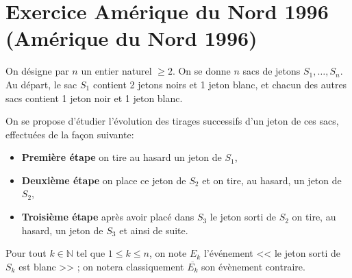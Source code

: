 \documentclass{article}
\makeatletter
\newcommand{\NN}{\mathbb N}
\newcounter{Exercice}
\newcommand{\exercice}[1][\@nil]{\refstepcounter{Exercice}
	\section*{Exercice \theExercice
	\def\tmp{#1}
	\ifx\tmp\@nnil
	\else
	(#1)
	\fi
}}
\makeatother
\begin{document}
\exercice[Amérique du Nord 1996]

On désigne par $n$ un entier naturel $\geq 2$. On se donne $n$ sacs de jetons $S_1,\ldots,S_n$. Au départ, le sac $S_1$ contient 2 jetons noirs et 1 jeton blanc, et chacun des autres sacs contient 1 jeton noir et 1 jeton blanc.

On se propose d'étudier l'évolution des tirages successifs d'un jeton de ces sacs, effectuées de la façon suivante:
\begin{itemize}
	\item \textbf{Première étape} on tire au hasard un jeton de $S_1$,
	\item \textbf{Deuxième étape} on place ce jeton de $S_2$ et on tire, au hasard, un jeton de $S_2$,
	\item \textbf{Troisième étape} après avoir placé dans $S_3$ le jeton sorti de $S_2$ on tire, au hasard, un jeton de $S_3$ et ainsi de suite. 
\end{itemize}

\begin{figure}[h]
	\centering
{}
\end{figure}

Pour tout $k\in\NN$ tel que $1\leq k\leq n$, on note $E_k$ l'événement << le jeton sorti de $S_k$ est blanc >> ; on notera classiquement $\overline{E_k}$ son évènement contraire.
\end{document}
